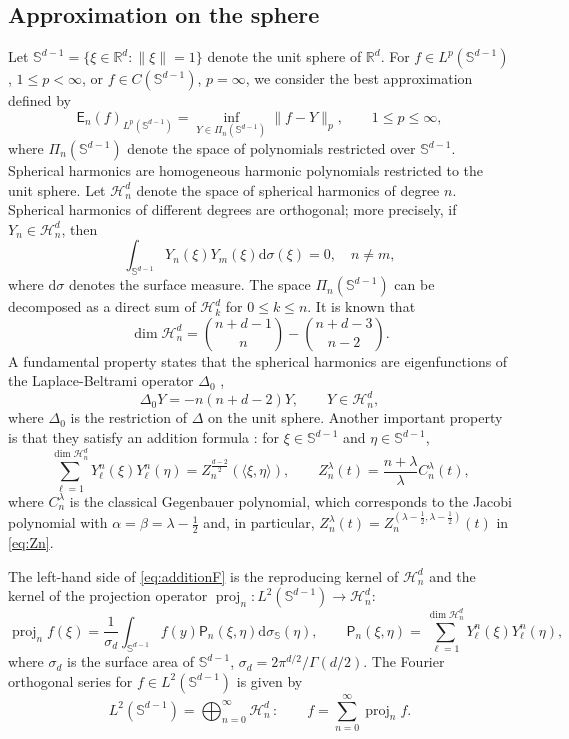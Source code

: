 \documentclass{amsart}
\theoremstyle{remark}
\def\la{{\langle}}
\def\ra{{\rangle}}
\def\d{\mathrm{d}}
\def\sph{{\mathbb{S}^{d-1}}}
\def\a{{\alpha}}
\def\b{{\beta}}
\def\l{{\lambda}}
\def\s{\sigma}
\def\la{{\langle}}
\def\ra{{\rangle}}
\def\CH{{\mathcal H}}
\def\RR{{\mathbb R}}
\def\SS{{\mathbb S}}
\def\proj{\operatorname{proj}}
\def\la{{\langle}}
\def\ra{{\rangle}}
\def\d{\mathrm{d}}
\def\sph{{\mathbb{S}^{d-1}}}
\def\sE{{\mathsf E}}
\def\sP{{\mathsf P}}
\def\a{{\alpha}}
\def\b{{\beta}}
\def\l{{\lambda}}
\def\s{\sigma}
\def\la{{\langle}}
\def\ra{{\rangle}}
\def\CH{{\mathcal H}}
\def\RR{{\mathbb R}}
\def\SS{{\mathbb S}}
\def\proj{\operatorname{proj}}
\def\f{\frac}
\def\f{\frac}
\begin{document}
\subsection{Approximation on the sphere}
Let $\sph = \{\xi \in \RR^d: \|\xi\| = 1\}$ denote the unit sphere of $\RR^d$. For $f\in L^p(\sph)$, $1\le p <\infty$, 
or $f\in C(\sph)$, $p = \infty$, we consider the best approximation defined by 
$$
   \sE_n(f)_{L^p(\sph)} = \inf_{Y\in \Pi_n(\sph)} \| f - Y\|_p, \qquad 1 \le p \le \infty,
$$
where $\Pi_n(\sph)$ denote the space of polynomials restricted over $\sph$. Spherical harmonics are  
homogeneous harmonic polynomials restricted to the unit sphere. Let $\CH_n^d$ denote the space of 
spherical harmonics of degree $n$. Spherical harmonics of different degrees are orthogonal; more precisely,
if $Y_n \in \CH_n^d$, then 
$$
  \int_\sph Y_n(\xi) Y_m(\xi) \d \s(\xi) = 0, \quad n \ne m,
$$
where $\d \s$ denotes the surface measure. The space $\Pi_n(\sph)$ can be decomposed as a direct sum of 
$\CH_k^d$ for $0 \le k \le n$. It is known that 
\begin{equation*} %
 \dim \CH_n^d =\binom{n+d-1}{n} - \binom{n+d-3}{n-2}.  
\end{equation*}   
A fundamental property states that the spherical harmonics are eigenfunctions of the Laplace-Beltrami 
operator $\Delta_0$ \cite[(1.4.9)]{DaiX}, 
\begin{equation} \label{eq:sph-harmonics}
     \Delta_0 Y = -n(n+d-2) Y, \qquad Y \in \CH_n^d,
\end{equation}
where $\Delta_0$ is the restriction of $\Delta$ on the unit sphere. Another important property is that
they satisfy an addition formula \cite[(1.2.3) and (1.2.7)]{DaiX}: for $\xi \in\sph$ and $\eta \in \sph$, 
\begin{equation} \label{eq:additionF}
   \sum_{\ell =1}^{\dim \CH_n^d} Y_\ell^n (\xi) Y_\ell^n(\eta) = Z_n^{\f{d-2}{2}} (\la \xi,\eta\ra), \qquad 
    Z_n^\l(t) = \frac{n+\l}{\l} C_n^\l(t),
\end{equation}
where $C_n^\l$ is the classical Gegenbauer polynomial, which corresponds to the Jacobi polynomial
with $\a=\b= \l-\f12$ and, in particular, $Z_n^\l(t) = Z_n^{(\l-\f12, \l-\f12)}(t)$ in \eqref{eq:Zn}. 

The left-hand side of \eqref{eq:additionF} is the reproducing kernel of $\CH_n^d$ and the kernel of 
the projection operator $\proj_n: L^2(\sph) \to \CH_n^d$: 
$$
   \proj_n f(\xi)  = \frac{1}{\s_d}\int_{\sph} f(y) \sP_n(\xi,\eta) \d\s_\SS(\eta), \qquad   
       \sP_n (\xi,\eta) =  \sum_{\ell =1}^{\dim \CH_n^d} Y_\ell^n (\xi) Y_\ell^n(\eta),
$$
where $\s_{d}$ is the surface area of $\sph$, $\s_d= 2 \pi^{d/2}/\Gamma(d/2)$. 
The Fourier orthogonal series for $f\in L^2(\sph)$ is given by 
$$
   L^2(\sph) = \bigoplus_{n=0}^\infty \CH_n^d\, : \qquad f = \sum_{n=0}^\infty \proj_n f. 
$$ 
\end{document}
